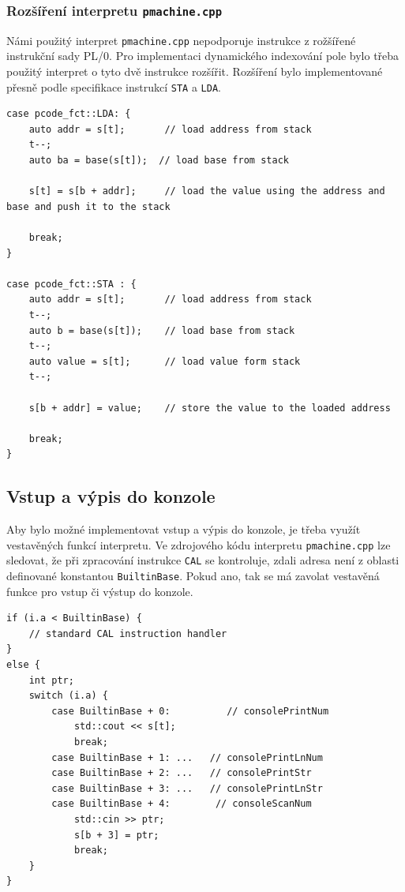 \documentclass[12pt, a4paper]{article}
\begin{document}
\subsubsection{Rozšíření interpretu \texttt{pmachine.cpp}}

Námi použitý interpret \texttt{pmachine.cpp} nepodporuje instrukce z rožšířené instrukční sady PL/0. Pro implementaci dynamického indexování pole bylo třeba použitý interpret o tyto dvě instrukce rozšířit. Rozšíření bylo implementované přesně podle specifikace instrukcí \texttt{STA} a \texttt{LDA}.


\begin{lstlisting}[caption={Rozšíření interpretu \texttt{pmachine.cpp} o instrukce \texttt{LDA} a \texttt{STA}}, captionpos=b]
case pcode_fct::LDA: {
    auto addr = s[t];       // load address from stack
    t--;
    auto ba = base(s[t]);  // load base from stack

    s[t] = s[b + addr];     // load the value using the address and base and push it to the stack

    break;
}

case pcode_fct::STA : {
    auto addr = s[t];       // load address from stack
    t--;
    auto b = base(s[t]);    // load base from stack
    t--;
    auto value = s[t];      // load value form stack
    t--;

    s[b + addr] = value;    // store the value to the loaded address

    break;
}
\end{lstlisting}


\subsection{Vstup a výpis do konzole}
Aby bylo možné implementovat vstup a výpis do konzole, je třeba využít vestavěných funkcí interpretu. Ve zdrojového kódu interpretu \texttt{pmachine.cpp} lze sledovat, že při zpracování instrukce \texttt{CAL} se kontroluje, zdali adresa není z oblasti definované konstantou \texttt{BuiltinBase}. Pokud ano, tak se má zavolat vestavěná funkce pro vstup či výstup do konzole.

\begin{lstlisting}[caption={Zpracování instrukce CAL v interpretu \texttt{pmachine.cpp}}, captionpos=b]
if (i.a < BuiltinBase) {
    // standard CAL instruction handler
}
else {
    int ptr;
    switch (i.a) {
        case BuiltinBase + 0:	       // consolePrintNum
            std::cout << s[t];
            break;
        case BuiltinBase + 1: ...   // consolePrintLnNum 
        case BuiltinBase + 2: ...	// consolePrintStr
        case BuiltinBase + 3: ...	// consolePrintLnStr
        case BuiltinBase + 4:        // consoleScanNum
            std::cin >> ptr;
            s[b + 3] = ptr;
            break;
    }
}
\end{lstlisting}
\end{document}
